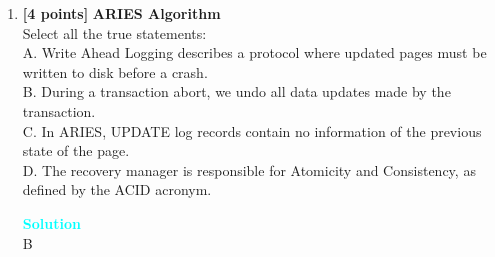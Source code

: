 \documentclass[10pt]{article}
\newenvironment{solution}
    { \begin{mdframed}[backgroundcolor=gray!10] \textcolor{cyan}{\textbf{Solution}} \\}
    {  \end{mdframed}}
\begin{document}
\begin{enumerate}
	\item \textbf{[4 points]} \textbf{ARIES Algorithm} \\
	      Select all the true statements: \\
	      A. Write Ahead Logging describes a protocol where updated pages must be written to disk before a crash. \\
	      B. During a transaction abort, we undo all data updates made by the transaction. \\
	      C. In ARIES, UPDATE log records contain no information of the previous state of the page. \\
	      D. The recovery manager is responsible for Atomicity and Consistency, as defined by the ACID acronym.
	      \begin{solution}
		      B
	      \end{solution}


\end{enumerate}
\end{document}

